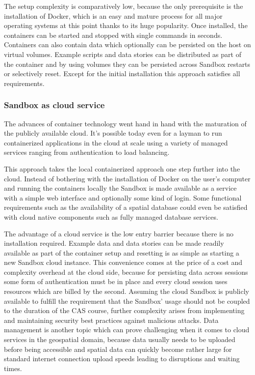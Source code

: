 \documentclass[11pt, a4paper, oneside, parskip=full-]{scrartcl}
\begin{document}
The setup complexity is comparatively low, because the only prerequisite is the
installation of Docker, which is an easy and mature process for all major
operating systems at this point thanks to its huge popularity. Once installed,
the containers can be started and stopped with single commands in seconds.
Containers can also contain data which optionally can be persisted on the host
on virtual volumes. Example scripts and data stories can be distributed as part
of the container and by using volumes they can be persisted across Sandbox
restarts or selectively reset. Except for the initial installation this approach
satisfies all requirements.

\subsubsection*{Sandbox as cloud service}
The advances of container technology went hand in hand with the maturation of
the publicly available cloud. It's possible today even for a layman to run
containerized applications in the cloud at scale using a variety of managed
services ranging from authentication to load balancing.

This approach takes the local containerized approach one step further into the
cloud. Instead of bothering with the installation of Docker on the user's
computer and running the containers locally the Sandbox is made available as a
service with a simple web interface and optionally some kind of login. Some
functional requirements such as the availability of a spatial database could
even be satisfied with cloud native components such as fully managed database
services.

The advantage of a cloud service is the low entry barrier because there is no
installation required. Example data and data stories can be made readily
available as part of the container setup and resetting is as simple as starting
a new Sandbox cloud instance. This convenience comes at the price of a cost and
complexity overhead at the cloud side, because for persisting data across
sessions some form of authentication must be in place and every cloud session
uses resources which are billed by the second. Assuming the cloud Sandbox is
publicly available to fulfill the requirement that the Sandbox' usage should not
be coupled to the duration of the CAS course, further complexity arises from
implementing and maintaining security best practices against malicious attacks.
Data management is another topic which can prove challenging when it comes to
cloud services in the geospatial domain, because data usually needs to be
uploaded before being accessible and spatial data can quickly become rather
large for standard internet connection upload speeds leading to disruptions and
waiting times.
\end{document}
